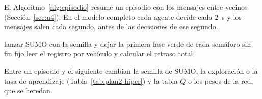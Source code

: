 El Algoritmo~\ref{alg:episodio} resume un episodio con los mensajes
entre vecinos (Sección~\ref{sec:u4}). En el modelo completo cada agente
decide cada 2~s y los mensajes salen cada segundo, antes de las
decisiones de ese segundo.

\begin{algorithm}[H]
\small
\caption[Un episodio con mensajes entre vecinos]{Un episodio con mensajes entre vecinos}
\label{alg:episodio}
lanzar SUMO con la semilla y dejar la primera fase verde de cada semáforo sin fin fijo\;
leer el registro por vehículo y calcular el retraso total\;
\end{algorithm}

Entre un episodio y el siguiente cambian la semilla de SUMO, la
exploración o la tasa de aprendizaje (Tabla~\ref{tab:plan2-hiper}) y la
tabla $Q$ o los pesos de la red, que se heredan.

